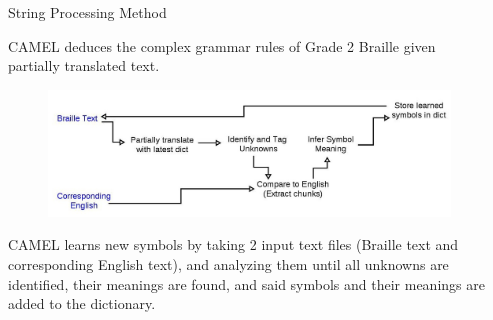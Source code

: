 \documentclass[final]{beamer}
\begin{document}
\begin{frame}{}
\begin{columns}[t]
\begin{column}{.3\linewidth}
  \end{column}
\begin{column}{.3\linewidth}
\vspace{-50pt}  
\begin{block}{{\small String Processing Method}} {\tiny
	CAMEL deduces the complex grammar rules of Grade 2 Braille given partially translated text.
	\begin{figure}\centering
	\includegraphics[width = 0.8\columnwidth]{Braillebig}
	\end{figure}
CAMEL learns new symbols by taking 2 input text files (Braille text and corresponding English text), and analyzing them until all unknowns are identified, their meanings are found, and said symbols and their meanings are added to the dictionary.\par}
\vspace{-30pt}
\end{block}


\end{column}
\end{columns}
\end{frame}
\end{document}
